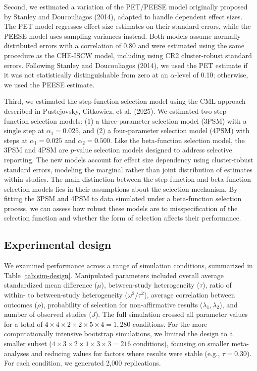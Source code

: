 \documentclass[
  american,
  man, donotrepeattitle,floatsintext]{apa7}
\begin{document}
Second, we estimated a variation of the PET/PEESE model originally proposed by Stanley and Doucouliagos (2014), adapted to handle dependent effect sizes. The PET model regresses effect size estimates on their standard errors, while the PEESE model uses sampling variances instead. Both models assume normally distributed errors with a correlation of 0.80 and were estimated using the same procedure as the CHE-ISCW model, including using CR2 cluster-robust standard errors. Following Stanley and Doucouliagos (2014), we used the PET estimate if it was not statistically distinguishable from zero at an \(\alpha\)-level of 0.10; otherwise, we used the PEESE estimate.

Third, we estimated the step-function selection model using the CML approach described in Pustejovsky, Citkowicz, et al. (2025). We estimated two step-function selection models: (1) a three-parameter selection model (3PSM) with a single step at \(\alpha_1 = 0.025\), and (2) a four-parameter selection model (4PSM) with steps at \(\alpha_1 = 0.025\) and \(\alpha_2 = 0.500\). Like the beta-function selection model, the 3PSM and 4PSM are \(p\)-value selection models designed to address selective reporting. The new models account for effect size dependency using cluster-robust standard errors, modeling the marginal rather than joint distribution of estimates within studies. The main distinction between the step-function and beta-function selection models lies in their assumptions about the selection mechanism. By fitting the 3PSM and 4PSM to data simulated under a beta-function selection process, we can assess how robust these models are to misspecification of the selection function and whether the form of selection affects their performance.

\subsection{Experimental design}\label{experimental-design}

We examined performance across a range of simulation conditions, summarized in Table \ref{tab:sim-design}. Manipulated parameters included overall average standardized mean difference (\(\mu\)), between-study heterogeneity (\(\tau\)), ratio of within- to between-study heterogeneity (\(\omega^2 / \tau^2\)), average correlation between outcomes (\(\rho\)), probability of selection for non-affirmative results (\(\lambda_1, \lambda_2\)), and number of observed studies (\(J\)). The full simulation crossed all parameter values for a total of \(4 \times 4 \times 2 \times 2 \times 5 \times 4 = 1,280\) conditions. For the more computationally intensive bootstrap simulations, we limited the design to a smaller subset (\(4 \times 3 \times 2 \times 1 \times 3 \times 3 = 216\) conditions), focusing on smaller meta-analyses and reducing values for factors where results were stable (e.g., \(\tau = 0.30\)). For each condition, we generated 2,000 replications.
\end{document}
